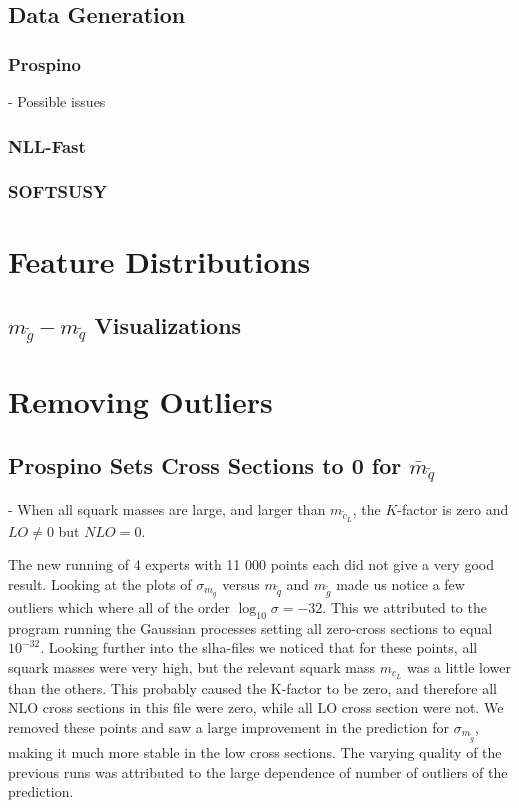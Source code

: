 \documentclass[twoside,english]{uiofysmaster}
\begin{document}
\subsection{Data Generation}

\subsubsection{Prospino}

- Possible issues

\subsubsection{NLL-Fast}

\subsubsection{SOFTSUSY}

\section{Feature Distributions}

\subsection{$m_{\tilde{g}} -m_{\tilde{q}}$ Visualizations}

\section{Removing Outliers}

\subsection{Prospino Sets Cross Sections to 0 for $\bar{m}_{\tilde{q}}$}

- When all squark masses are large, and larger than $m_{\tilde{c}_L}$, the $K$-factor is zero and $LO \neq 0$ but $NLO = 0$.

The new running of 4 experts with 11 000 points each did not give a very good result. Looking at the plots of $\sigma_{m_{g}}$ versus $m_{\tilde{q}}$ and $m_{\tilde{g}}$ made us notice a few outliers which where all of the order $\log_{10} \sigma = -32$. This we attributed to the program running the Gaussian processes setting all zero-cross sections to equal $10^{-32}$. Looking further into the slha-files we noticed that for these points, all squark masses were very high, but the relevant squark mass $m_{c_L}$ was a little lower than the others. This probably caused the K-factor to be zero, and therefore all NLO cross sections in this file were zero, while all LO cross section were not. We removed these points and saw a large improvement in the prediction for $\sigma_{m_{\tilde{g}}}$, making it much more stable in the low cross sections. The varying quality of the previous runs was attributed to the large dependence of number of outliers of the prediction.
\end{document}
